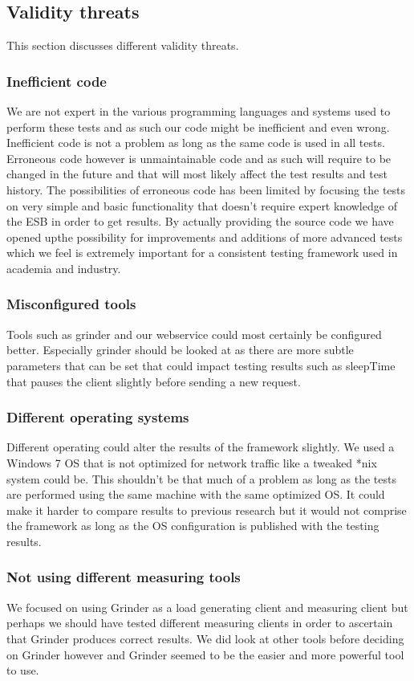 \subsection{Validity threats}
This section discusses different validity threats.
\subsubsection{Inefficient code}
We are not expert in the various programming languages and systems used to perform these tests and as such our code might be inefficient and even wrong. Inefficient code is not a problem as long as the same code is used in all tests. Erroneous code however is unmaintainable code and as such will require to be changed in the future and that will most likely affect the test results and test history. 
The possibilities of erroneous code has been limited by focusing the tests on very simple and basic functionality that doesn't require expert knowledge of the ESB in order to get results.
By actually providing the source code we have opened upthe possibility for improvements and additions of more advanced tests which we feel is extremely important for a consistent testing framework used in academia and industry.

\subsubsection{Misconfigured tools}
Tools such as grinder and our webservice could most certainly be configured better. Especially grinder should be looked at as there are more subtle parameters that can be set that could impact testing results such as sleepTime that pauses the client slightly before sending a new request.

\subsubsection{Different operating systems}
Different operating could alter the results of the framework slightly. We used a Windows 7 OS that is not optimized for network traffic like a tweaked *nix system could be.
This shouldn't be that much of a problem as long as the tests are performed using the same machine with the same optimized OS. 
It could make it harder to compare results to previous research but it would not comprise the framework as long as the OS configuration is published with the testing results.

\subsubsection{Not using different measuring tools}
We focused on using Grinder as a load generating client and measuring client but perhaps we should have tested different measuring clients in order to ascertain that Grinder produces correct results.
We did look at other tools before deciding on Grinder however and Grinder seemed to be the easier and more powerful tool to use.


